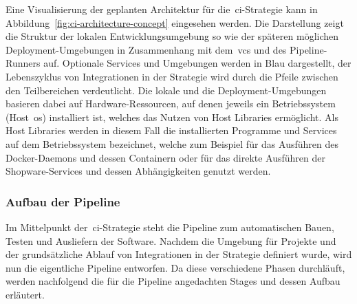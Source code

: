 Eine Visualisierung der geplanten Architektur für die\ \acrshort{ci}-Strategie kann in
Abbildung\ \ref{fig:ci-architecture-concept} eingesehen werden.
Die Darstellung zeigt die Struktur der lokalen Entwicklungsumgebung so wie der späteren möglichen
Deployment-Umgebungen in Zusammenhang mit dem\ \acrshort{vcs} und des Pipeline-Runners auf.
Optionale Services und Umgebungen werden in Blau dargestellt, der Lebenszyklus von Integrationen in der Strategie wird
durch die Pfeile zwischen den Teilbereichen verdeutlicht.
Die lokale und die Deployment-Umgebungen basieren dabei auf Hardware-Ressourcen, auf denen jeweils ein
Betriebssystem (Host\ \acrshort{os}) installiert ist, welches das Nutzen von Host Libraries ermöglicht.
Als Host Libraries werden in diesem Fall die installierten Programme und Services auf dem Betriebssystem bezeichnet,
welche zum Beispiel für das Ausführen des Docker-Daemons und dessen Containern oder für das direkte Ausführen der
Shopware-Services und dessen Abhängigkeiten genutzt werden.

\subsubsection{Aufbau der Pipeline}

Im Mittelpunkt der\ \acrshort{ci}-Strategie steht die Pipeline zum automatischen Bauen, Testen und Ausliefern der
Software.
Nachdem die Umgebung für Projekte und der grundsätzliche Ablauf von Integrationen in der Strategie definiert wurde, wird
nun die eigentliche Pipeline entworfen.
Da diese verschiedene Phasen durchläuft, werden nachfolgend die für die Pipeline angedachten Stages und dessen
Aufbau erläutert.

